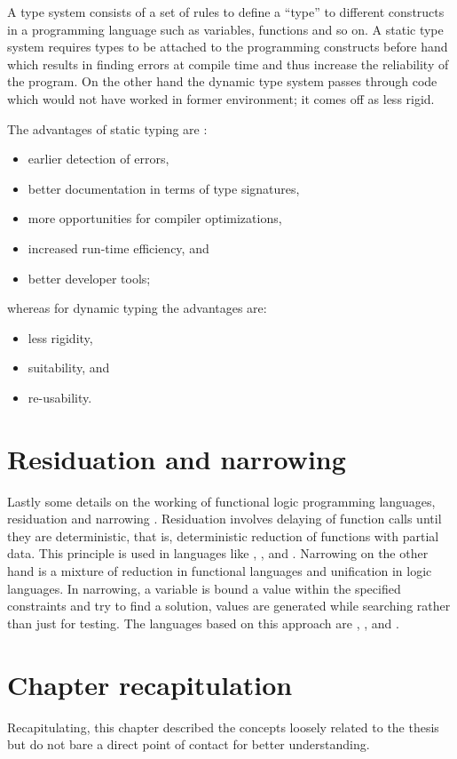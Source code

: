 \documentclass[proposal.tex]{subfiles}
\begin{document}
A type system consists of a set of rules to define a ``type'' to different constructs in a
programming language such as variables, functions and so on.
A static type system requires types to be attached to the programming constructs before hand which results in
finding errors at compile time and thus increase the reliability of the program.
On the other hand the dynamic type system passes through code which would not have worked in former
environment; it comes off as less rigid.


The advantages of static typing \cite{meijer2004static} are :
\begin{itemize}
\item earlier detection of errors,
\item better documentation in terms of type signatures,
\item more opportunities for compiler optimizations,
\item increased run-time efficiency, and
\item better developer tools;
\end{itemize}

whereas for dynamic typing the advantages are:
\begin{itemize}
\item less rigidity,
\item suitability, and
\item re-usability.
\end{itemize}

\section{Residuation and narrowing}
Lastly some details on the working of functional logic programming languages, residuation and narrowing
\cite{hanus1995curry,webiste:wikicurry}.
Residuation involves delaying of function calls until they are deterministic, that is, deterministic reduction of
functions with partial data.
This principle is used in languages like  \cite{lloyd1999programming:escher}, 
\cite{website:life},  \cite{website:nue-prolog} and  \cite{website:oz-mozart}.
Narrowing on the other hand is a mixture of reduction in functional languages and unification in logic languages.
In narrowing, a variable is bound a value within the specified constraints and try to find a solution, values are
generated while searching rather than just for testing.
The languages based on this approach are  \cite{website:alf},  \cite{website:babel},
 \cite{bert1987lpg} and  \cite{website:curry}.


\section{Chapter recapitulation}
Recapitulating, this chapter described the concepts loosely related to the thesis but do not bare a direct point of
contact for better understanding.
\end{document}
